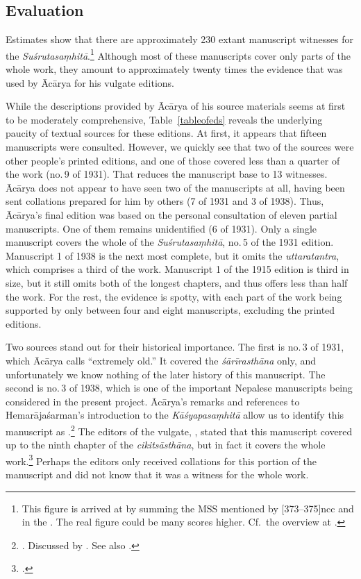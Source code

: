 \subsection{Evaluation}

Estimates show that there are approximately 230 extant manuscript witnesses for
the \emph{Suśrutasaṃhitā}.\footnote{This figure is arrived at by summing the MSS
    mentioned by [373--375]{ncc} and in the \cite{ngmcp}. The real figure
    could be many scores higher.  Cf.\ the overview at
    \cite{wuja-2020}.\label{SSmss}}  Although most of these manuscripts cover only
    parts of the whole work, they amount to approximately twenty times the evidence
    that was used by Ācārya for his vulgate editions.

While the descriptions provided by Ācārya of his source materials seems at
first to be moderately comprehensive, Table~\ref{tableofeds} reveals the
underlying paucity of textual sources for these editions.  At first, it
appears that fifteen manuscripts were consulted.  However, we quickly see that
two of the sources were other people's printed editions, and one of those
covered less than a quarter of the work (no.\,9 of 1931).  That reduces the
manuscript base to 13 witnesses. Ācārya does not appear to have seen two of
the manuscripts at all, having been sent collations prepared for him by others
(7 of 1931 and 3 of 1938).  Thus, Ācārya's final edition was based on the
personal consultation of eleven partial manuscripts.   One of them remains
unidentified (6 of 1931). Only a single manuscript covers the whole of the
\emph{Suśrutasaṃhitā}, no.\,5 of the 1931 edition.  Manuscript 1 of 1938 is
the next most complete, but it omits the \emph{uttaratantra}, which comprises
a third of the work.  Manuscript 1 of the 1915 edition is third in size, but
it still omits both of the longest chapters, and thus offers less than half
the work.  For the rest, the evidence is spotty, with each part of the work
being supported by only between four and eight manuscripts, excluding the
printed editions.

Two sources stand out for their historical importance.  The first is no.\,3 of
1931, which Ācārya calls “extremely old.”  It covered the \emph{śārīrasthāna}
only, and unfortunately we know nothing of the later history of this manuscript.
The second is no.\,3 of 1938, which is one of the important Nepalese manuscripts
being considered in the present project. Ācārya's remarks and references to
Hemarājaśarman's introduction to the \emph{Kāśyapasaṃhitā} allow us to identify
this manuscript as .\footnote{\cites[22]{vulgate}[56--57]{hema-1938}. Discussed by \citet[\S
    1.1, 2.3]{kleb-2021b}.  See also \cites[IIB,
    25--41]{meul-hist}[161--169]{wuja-2003}.} The editors of the vulgate,
    \citeauthor{vulgate}, stated that this manuscript covered up to the ninth chapter
    of the \emph{cikitsāsthāna}, but in fact it covers the whole
    work.\footcite[22]{vulgate}  Perhaps the editors only received collations for this
    portion of the manuscript and did not know that it was a witness for the whole
    work.

